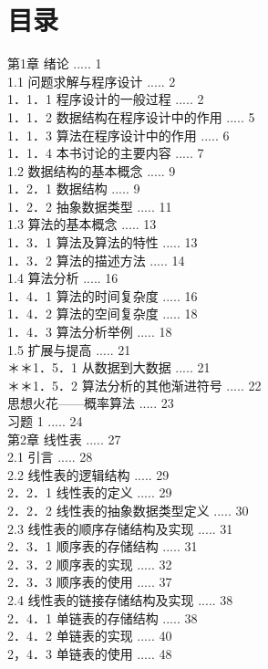 \documentclass[10pt]{article}
\begin{document}
\section*{目录}
第1章 绪论 ..... 1\\
1.1 问题求解与程序设计 ..... 2\\
1．1．1 程序设计的一般过程 ..... 2\\
1．1．2 数据结构在程序设计中的作用 ..... 5\\
1．1．3 算法在程序设计中的作用 ..... 6\\
1．1．4 本书讨论的主要内容 ..... 7\\
1.2 数据结构的基本概念 ..... 9\\
1．2．1 数据结构 ..... 9\\
1．2．2 抽象数据类型 ..... 11\\
1.3 算法的基本概念 ..... 13\\
1．3．1 算法及算法的特性 ..... 13\\
1．3．2 算法的描述方法 ..... 14\\
1.4 算法分析 ..... 16\\
1．4．1 算法的时间复杂度 ..... 16\\
1．4．2 算法的空间复杂度 ..... 18\\
1．4．3 算法分析举例 ..... 18\\
1.5 扩展与提高 ..... 21\\
＊＊1．5．1 从数据到大数据 ..... 21\\
＊＊1．5．2 算法分析的其他渐进符号 ..... 22\\
思想火花——概率算法 ..... 23\\
习题 1 ..... 24\\
第2章 线性表 ..... 27\\
2.1 引言 ..... 28\\
2.2 线性表的逻辑结构 ..... 29\\
2．2．1 线性表的定义 ..... 29\\
2．2．2 线性表的抽象数据类型定义 ..... 30\\
2.3 线性表的顺序存储结构及实现 ..... 31\\
2．3．1 顺序表的存储结构 ..... 31\\
2．3．2 顺序表的实现 ..... 32\\
2．3．3 顺序表的使用 ..... 37\\
2.4 线性表的链接存储结构及实现 ..... 38\\
2．4．1 单链表的存储结构 ..... 38\\
2．4．2 单链表的实现 ..... 40\\
2，4．3 单链表的使用 ..... 48\\
\end{document}

